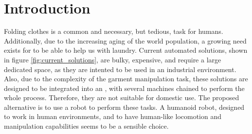 \chapter{Introduction}
\label{introduction}

Folding clothes is a common and necessary, but tedious, task for humans. Additionally, due to the increasing aging of the world population, a growing need exists for 
to be able to help us with laundry. Current automated solutions, shown in figure \ref{fig:current_solutions}, are bulky, expensive, and require a large dedicated space, as they are intented to be used in an industrial environment. Also, due to the complexity of the garment manipulation task,  these solutions are designed to be integrated into an , with several machines chained to perform the whole process. Therefore, they are not suitable for domestic use. The proposed alternative is to use a robot to perform these  tasks. A humanoid robot, designed to work in human environments, and to have human-like locomotion and manipulation capabilities seems to be a sensible choice.


